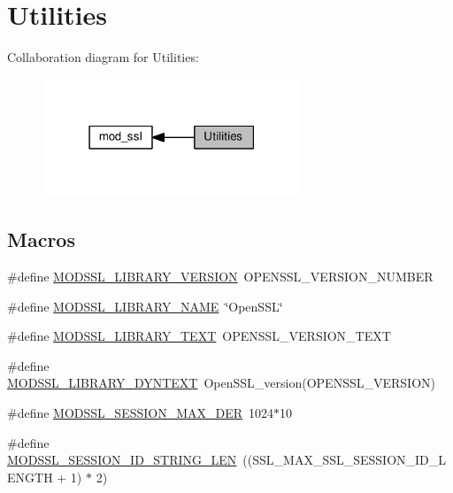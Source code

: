 \hypertarget{group__MOD__SSL__UTIL}{}\section{Utilities}
\label{group__MOD__SSL__UTIL}
Collaboration diagram for Utilities\+:
\nopagebreak
\begin{figure}[H]
\begin{center}
\leavevmode
\includegraphics[width=219pt]{group__MOD__SSL__UTIL}
\end{center}
\end{figure}
\subsection*{Macros}
\begin{DoxyCompactItemize}
\item 
\#define \hyperlink{group__MOD__SSL__UTIL_ga69e719c4e3cc5f9d8038c18a7240482f}{M\+O\+D\+S\+S\+L\+\_\+\+L\+I\+B\+R\+A\+R\+Y\+\_\+\+V\+E\+R\+S\+I\+ON}~O\+P\+E\+N\+S\+S\+L\+\_\+\+V\+E\+R\+S\+I\+O\+N\+\_\+\+N\+U\+M\+B\+ER
\item 
\#define \hyperlink{group__MOD__SSL__UTIL_ga745269f1532440b23c691b5febedb539}{M\+O\+D\+S\+S\+L\+\_\+\+L\+I\+B\+R\+A\+R\+Y\+\_\+\+N\+A\+ME}~\char`\"{}Open\+S\+SL\char`\"{}
\item 
\#define \hyperlink{group__MOD__SSL__UTIL_ga8483b8fd1bc5ff050b4c0154b3f1cd0f}{M\+O\+D\+S\+S\+L\+\_\+\+L\+I\+B\+R\+A\+R\+Y\+\_\+\+T\+E\+XT}~O\+P\+E\+N\+S\+S\+L\+\_\+\+V\+E\+R\+S\+I\+O\+N\+\_\+\+T\+E\+XT
\item 
\#define \hyperlink{group__MOD__SSL__UTIL_ga7199e41b3460675e9b97e9582471c8e9}{M\+O\+D\+S\+S\+L\+\_\+\+L\+I\+B\+R\+A\+R\+Y\+\_\+\+D\+Y\+N\+T\+E\+XT}~Open\+S\+S\+L\+\_\+version(O\+P\+E\+N\+S\+S\+L\+\_\+\+V\+E\+R\+S\+I\+ON)
\item 
\#define \hyperlink{group__MOD__SSL__UTIL_ga33ff82b5abee9e2a133dbc1108e40688}{M\+O\+D\+S\+S\+L\+\_\+\+S\+E\+S\+S\+I\+O\+N\+\_\+\+M\+A\+X\+\_\+\+D\+ER}~1024$\ast$10
\item 
\#define \hyperlink{group__MOD__SSL__UTIL_ga536fe93cdb182005c2482441ea973f16}{M\+O\+D\+S\+S\+L\+\_\+\+S\+E\+S\+S\+I\+O\+N\+\_\+\+I\+D\+\_\+\+S\+T\+R\+I\+N\+G\+\_\+\+L\+EN}~((S\+S\+L\+\_\+\+M\+A\+X\+\_\+\+S\+S\+L\+\_\+\+S\+E\+S\+S\+I\+O\+N\+\_\+\+I\+D\+\_\+\+L\+E\+N\+G\+TH + 1) $\ast$ 2)
\end{DoxyCompactItemize}
